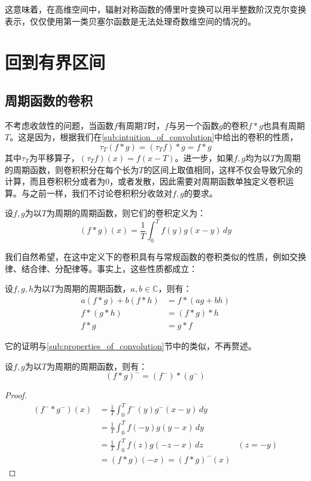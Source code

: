 \documentclass{ctexbook}
\begin{document}
这意味着，在高维空间中，辐射对称函数的傅里叶变换可以用半整数阶汉克尔变换表示，仅仅使用第一类贝塞尔函数是无法处理奇数维空间的情况的。

\section{回到有界区间}\label{sec:Finite_Interval}

\subsection{周期函数的卷积}\label{sub:conv_of_period_func}

不考虑收敛性的问题，当函数$f$有周期$T$时，$f$与另一个函数$g$的卷积$f*g$也具有周期$T$。这是因为，根据我们在\ref{sub:intuition_of_convolution}中给出的卷积的性质，
\[\tau_T(f*g)=(\tau_T f)*g=f*g\]
其中$\tau_T$为平移算子，$(\tau_T f)(x)=f(x-T)$。进一步，如果$f,g$均为以$T$为周期的周期函数，则卷积积分在每个长为$T$的区间上取值相同，这样不仅会导致冗余的计算，而且卷积积分或者为0，或者发散，因此需要对周期函数单独定义卷积运算。与之前一样，我们不讨论卷积积分收敛对$f,g$的要求。

\begin{definition}[周期函数的卷积]
    设$f,g$为以$T$为周期的周期函数，则它们的卷积定义为：
    \[(f*g)(x)=\frac{1}{T}\int_{0}^{T}f(y)g(x-y)\,dy\]
\end{definition}

我们自然希望，在这中定义下的卷积具有与常规函数的卷积类似的性质，例如交换律、结合律、分配律等。事实上，这些性质都成立：
\begin{proposition}
    设$f,g,h$为以$T$为周期的周期函数，$a,b\in\mathbb{C}$，则有：
    \begin{align*}
        a(f*g)+b(f*h)&=f*(ag+bh)\\
        f*(g*h)&=(f*g)*h\\
        f*g&=g*f
    \end{align*}    
\end{proposition}
它的证明与\ref{sub:properties_of_convolution}节中的类似，不再赘述。

\begin{proposition}[信号反转]
    设$f,g$为以$T$为周期的周期函数，则有：
    \[(f*g)^-=(f^-)*(g^-)\]
\end{proposition}
\begin{proof}
    \begin{align*}
        (f^-*g^-)(x)&=\frac{1}{T}\int_0^{T}f^-(y)g^-(x-y)\,dy\\
        &=\frac{1}{T}\int_0^{T}f(-y)g(y-x)\,dy\\
        &=\frac{1}{T}\int_0^{T}f(z)g(-z-x)\,dz&(z=-y)\\
        &=(f*g)(-x)=(f*g)^-(x)
    \end{align*}
\end{proof}
\end{document}
